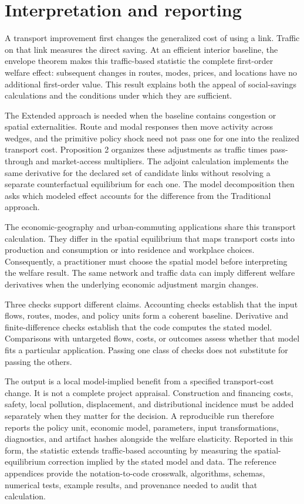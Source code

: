 \section{Interpretation and reporting}
\label{ch:conclusion}

A transport improvement first changes the generalized cost of using a link.
Traffic on that link measures the direct saving. At an efficient interior
baseline, the envelope theorem makes this traffic-based statistic the complete
first-order welfare effect: subsequent changes in routes, modes, prices, and
locations have no additional first-order value. This result explains both
the appeal of social-savings calculations and the conditions under which they
are sufficient.

The Extended approach is needed when the baseline contains congestion or
spatial externalities. Route and modal responses then move activity across
wedges, and the primitive policy shock need not pass one for one into the
realized transport cost. Proposition 2 organizes these adjustments as traffic
times pass-through and market-access multipliers. The adjoint calculation
implements the same derivative for the declared set of candidate links without
resolving a separate counterfactual equilibrium for each one. The model
decomposition then asks which modeled effect accounts for the difference
from the Traditional approach.

The economic-geography and urban-commuting applications share this transport
calculation. They differ in the spatial equilibrium that maps transport costs
into production and consumption or into residence and workplace choices.
Consequently, a practitioner must choose the spatial model before
interpreting the welfare result. The same network and traffic data can imply
different welfare derivatives when the underlying economic adjustment margin
changes.

Three checks support different claims. Accounting checks establish that the
input flows, routes, modes, and policy units form a coherent baseline.
Derivative and finite-difference checks establish that the code computes the
stated model. Comparisons with untargeted flows, costs, or outcomes assess
whether that model fits a particular application. Passing one class
of checks does not substitute for passing the others.

The output is a local model-implied benefit from a specified transport-cost
change. It is not a complete project appraisal. Construction and financing
costs, safety, local pollution, displacement, and distributional incidence
must be added separately when they matter for the decision. A reproducible run
therefore reports the policy unit, economic model, parameters, input
transformations, diagnostics, and artifact hashes alongside the welfare
elasticity. Reported in this form, the statistic extends traffic-based
accounting by measuring the spatial-equilibrium correction implied by the
stated model and data. The reference appendices provide the notation-to-code
crosswalk, algorithms, schemas, numerical tests, example results, and
provenance needed to audit that calculation.
